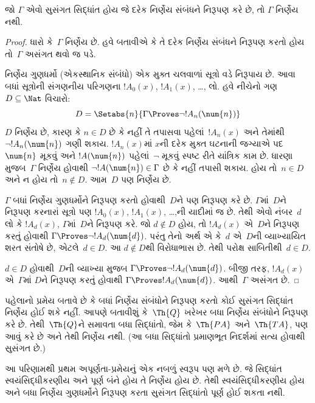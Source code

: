 \begin{thm}
જો $\Gamma$ એવો સુસંગત સિદ્ધાંત હોય જે
દરેક નિર્ણેય સંબંધને નિરૂપણ
કરે છે, તો $\Gamma$ નિર્ણેય નથી.
\end{thm}

\begin{proof}
ધારો કે~$\Gamma$ નિર્ણેય છે. હવે
બતાવીએ કે તે દરેક નિર્ણેય સંબંધને
નિરૂપણ કરતો હોય તો~$\Gamma$ અસંગત થવો જ
પડે.

નિર્ણેય ગુણધર્મો (એકસ્થાનિક સંબંધો)
એક મુક્ત ચલવાળાં સૂત્રો વડે નિરૂપાય
છે. આવા બધાં સૂત્રોની સંગણનીય પરિગણના
$!A_0(x)$, $!A_1(x)$, \dots, લો. હવે
નીચેનો ગણ~$D \subseteq \Nat$ વિચારો:
\[
D = \Setabs{n}{\Gamma \Proves \lnot !A_n(\num{n})}
\]
$D$ નિર્ણેય છે, કારણ કે $n \in D$
છે કે નહીં તે તપાસવા પહેલાં~$!A_n(x)$
અને તેમાંથી~$\lnot !A_n(\num{n})$ ગણી
શકાય. $!A_n(x)$માં $x$ની દરેક મુક્ત
ઘટનાની જગ્યાએ પદ~$\num{n}$ મૂકવું અને
$!A(\num{n})$ પહેલાં~$\lnot$ મૂકવું સ્પષ્ટ
રીતે યાંત્રિક કામ છે. ધારણા મુજબ~$\Gamma$
નિર્ણેય હોવાથી
$\lnot !A(\num{n}) \in \Gamma$ છે કે નહીં
તપાસી શકાય. હોય તો~$n \in D$ અને
ન હોય તો~$n \notin D$. આમ~$D$
પણ નિર્ણેય છે.

$\Gamma$ બધાં નિર્ણેય ગુણધર્મોને
નિરૂપણ કરતો હોવાથી~$D$ને પણ
નિરૂપણ કરે છે. $\Gamma$માં~$D$ને
નિરૂપણ કરનારાં સૂત્રો પણ
$!A_0(x)$, $!A_1(x)$, \dots,ની યાદીમાં
જ છે. તેથી એવો નંબર~$d$ લો કે
$!A_d(x)$, $\Gamma$માં~$D$ને
નિરૂપણ કરે. જો $d \notin D$ હોય,
તો $!A_d(x)$ એ~$D$ને નિરૂપણ
કરતું હોવાથી $\Gamma \Proves
\lnot !A_d(\num{d})$. પરંતુ તેનો અર્થ
એ કે~$d$ એ~$D$ની વ્યાખ્યાયિત શરત
સંતોષે છે, એટલે~$d \in D$. આ
$d \notin D$થી વિરોધાભાસ છે. તેથી
પરોક્ષ સાબિતીથી~$d \in D$.

$d \in D$ હોવાથી~$D$ની વ્યાખ્યા મુજબ
$\Gamma \Proves \lnot !A_d(\num{d})$.
બીજી તરફ, $!A_d(x)$ એ~$\Gamma$માં
$D$ને નિરૂપણ કરતું હોવાથી
$\Gamma \Proves !A_d(\num{d})$.
આથી~$\Gamma$ અસંગત છે.
\end{proof}

\begin{explain}
પહેલાનો પ્રમેય બતાવે છે કે બધાં
નિર્ણેય સંબંધોને નિરૂપણ
કરતો કોઈ સુસંગત સિદ્ધાંત નિર્ણેય
હોઈ શકે નહીં. આપણે બતાવીશું કે~$\Th{Q}$
ખરેખર બધા નિર્ણેય સંબંધોને
નિરૂપણ કરે છે. તેથી~$\Th{Q}$ને
સમાવતા બધા સિદ્ધાંતો, જેમ કે~$\Th{PA}$
અને~$\Th{TA}$, પણ આવું કરે છે અને તેથી
નિર્ણેય નથી. (આ બધા સિદ્ધાંતો
પ્રમાણભૂત નિદર્શમાં સત્ય હોવાથી સુસંગત છે.)

આ પરિણામથી પ્રથમ અપૂર્ણતા-પ્રમેયનું એક
નબળું સ્વરૂપ પણ મળે છે. જે સિદ્ધાંત
સ્વયંસિદ્ધીકરણીય અને પૂર્ણ બંને
હોય તે નિર્ણેય હોય છે. તેથી
સ્વયંસિદ્ધીકરણીય હોય અને બધા
નિર્ણેય ગુણધર્મોને નિરૂપણ
કરતા સુસંગત સિદ્ધાંતો પૂર્ણ
હોઈ શકતા નથી.
\end{explain}

